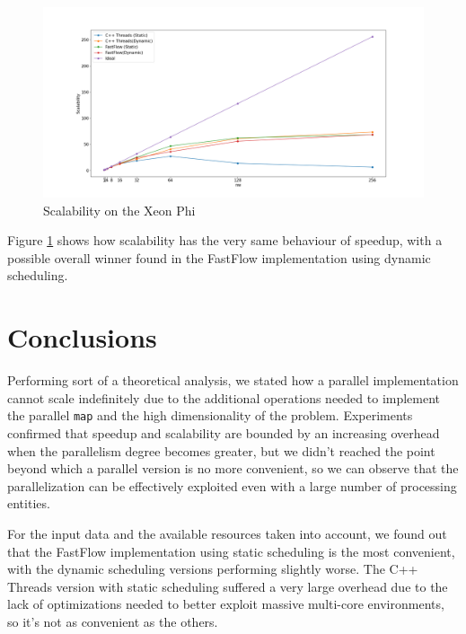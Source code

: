 \documentclass[a4paper]{article}
\begin{document}
\begin{figure}
    \centering
    \includegraphics[width=\textwidth]{plots/scalability.png}
    \caption{Scalability on the Xeon Phi}
    \label{fig:scalability}
\end{figure}

Figure \ref{fig:scalability} shows how scalability has the very same behaviour of speedup, with a possible overall winner found in the FastFlow implementation using dynamic scheduling.

\section{Conclusions}

Performing sort of a theoretical analysis, we stated how a parallel implementation cannot scale indefinitely due to the additional operations needed to implement the parallel \texttt{map} and the high dimensionality of the problem. Experiments confirmed that speedup and scalability are bounded by an increasing overhead when the parallelism degree becomes greater, but we didn't reached the point beyond which a parallel version is no more convenient, so we can observe that the parallelization can be effectively exploited even with a large number of processing entities.

For the input data and the available resources taken into account, we found out that the FastFlow implementation using static scheduling is the most convenient, with the dynamic scheduling versions performing slightly worse. The C++ Threads version with static scheduling suffered a very large overhead due to the lack of optimizations needed to better exploit massive multi-core environments, so it's not as convenient as the others.
\end{document}
